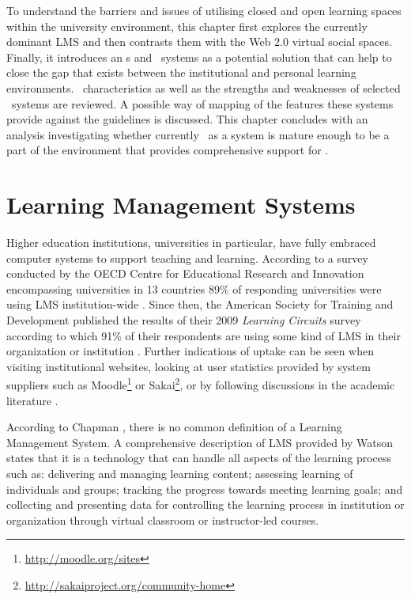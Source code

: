 To understand the barriers and issues of utilising closed and open learning
spaces within the university environment, this chapter first explores the
currently dominant LMS and then contrasts them with the Web 2.0 virtual social
spaces. Finally, it introduces an \ep s and \ep~systems as a potential solution
that can help to close the gap that exists between the institutional and
personal learning environments. \ep~characteristics as well as the strengths and
weaknesses of selected \ep~systems are reviewed. A possible way of mapping of
the features these systems provide against the \LLLs guidelines is discussed.
This chapter concludes with an analysis investigating whether currently \ep~as a
system is mature enough to be a part of the environment that provides
comprehensive support for \LLLsn.

\section{Learning Management Systems}
Higher education institutions, universities in particular, have fully embraced
computer systems to support teaching and learning. According to a survey
conducted by the OECD Centre for Educational Research and Innovation
encompassing universities in 13 countries 89\% of responding universities were
using LMS institution-wide \citep{OECD2005}. Since then, the American Society
for Training and Development published the results of their 2009
\textit{Learning Circuits} survey according to which 91\% of their respondents
are using some kind of LMS in their organization or institution
\citep{Ellis2009}. Further indications of uptake can be seen when visiting
institutional websites, looking at user statistics provided by system suppliers
such as Moodle\footnote{\url{http://moodle.org/sites}} or
Sakai\footnote{\url{http://sakaiproject.org/community-home}}, or by following
discussions in the academic literature \citep{Browne2006,Collis2004}.

According to Chapman \citeyearpar{Chapman2009}, there is no common definition of
a Learning Management System. A comprehensive description of LMS provided by
Watson \citeyearpar{Watson2007} states that it is a technology that can handle
all aspects of the learning process such as: delivering and managing learning
content; assessing learning of individuals and groups; tracking the progress
towards meeting learning goals; and collecting and presenting data for
controlling the learning process in institution or organization through virtual
classroom or instructor-led courses.

